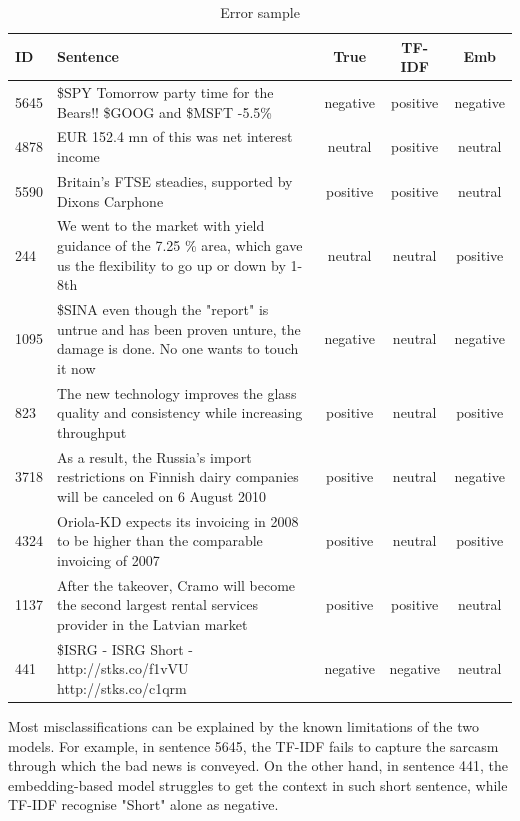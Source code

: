 \documentclass[11pt]{article}
\begin{document}
    \medskip
    \begin{table}[h]
        \centering
        \footnotesize

        \begin{tabularx}{\textwidth}{lXccc}
            \toprule
            ID & Sentence & True & TF-IDF & Emb \\
            \midrule
            5645 & \$SPY Tomorrow party time for the Bears!! \$GOOG and \$MSFT -5.5\% & negative & positive & negative \\
            4878 & EUR 152.4 mn of this was net interest income & neutral & positive & neutral \\
            5590 & Britain's FTSE steadies, supported by Dixons Carphone & positive & positive & neutral \\
            244 & We went to the market with yield guidance of the 7.25 \% area, which gave us the flexibility to go up or down by 1-8th & neutral & neutral & positive \\
            1095 & \$SINA even though the "report" is untrue and has been proven unture, the damage is done. No one wants to touch it now & negative & neutral & negative \\
            823 & The new technology improves the glass quality and consistency while increasing throughput & positive & neutral & positive \\
            3718 & As a result, the Russia's import restrictions on Finnish dairy companies will be canceled on 6 August 2010 & positive & neutral & negative \\
            4324 & Oriola-KD expects its invoicing in 2008 to be higher than the comparable invoicing of 2007 & positive & neutral & positive \\
            1137 & After the takeover, Cramo will become the second largest rental services provider in the Latvian market & positive & positive & neutral \\
            441 & \$ISRG - ISRG Short - http://stks.co/f1vVU http://stks.co/c1qrm & negative & negative & neutral \\
            \bottomrule
        \end{tabularx}

        \tiny\caption{Error sample}
    \end{table}

    Most misclassifications can be explained by the known limitations of the two models. For example, in sentence 5645, the TF-IDF fails to capture the sarcasm through which the bad news is conveyed. On the other hand, in sentence 441, the embedding-based model struggles to get the context in such short sentence, while TF-IDF recognise "Short" alone as negative.
\end{document}
